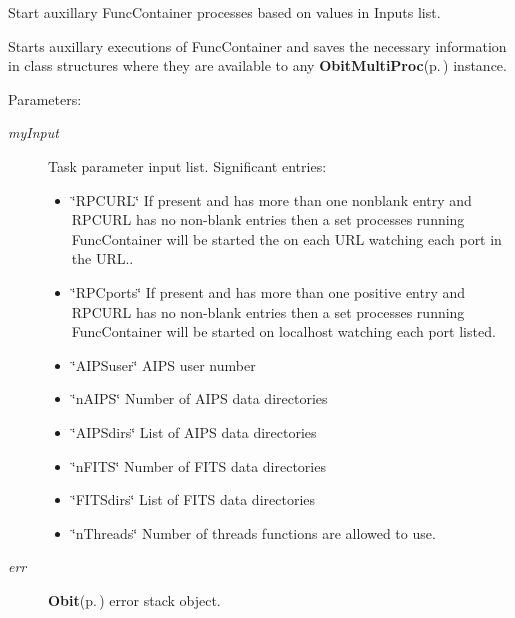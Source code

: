 Start auxillary Func\-Container processes based on values in Inputs list. 

Starts auxillary executions of Func\-Container and saves the necessary information in class structures where they are available to any {\bf Obit\-Multi\-Proc}{\rm (p.\,\pageref{structObitMultiProc})} instance. \begin{Desc}
\item[Parameters:]
\begin{description}
\item[{\em my\-Input}]Task parameter input list. Significant entries: \begin{itemize}
\item \char`\"{}RPCURL\char`\"{} If present and has more than one nonblank entry and RPCURL has no non-blank entries then a set processes running Func\-Container will be started the on each URL watching each port in the URL.. \item \char`\"{}RPCports\char`\"{} If present and has more than one positive entry and RPCURL has no non-blank entries then a set processes running Func\-Container will be started on localhost watching each port listed. \item \char`\"{}AIPSuser\char`\"{} AIPS user number \item \char`\"{}n\-AIPS\char`\"{} Number of AIPS data directories \item \char`\"{}AIPSdirs\char`\"{} List of AIPS data directories \item \char`\"{}n\-FITS\char`\"{} Number of FITS data directories \item \char`\"{}FITSdirs\char`\"{} List of FITS data directories \item \char`\"{}n\-Threads\char`\"{} Number of threads functions are allowed to use. \end{itemize}
\item[{\em err}]{\bf Obit}{\rm (p.\,\pageref{structObit})} error stack object. \end{description}
\end{Desc}
